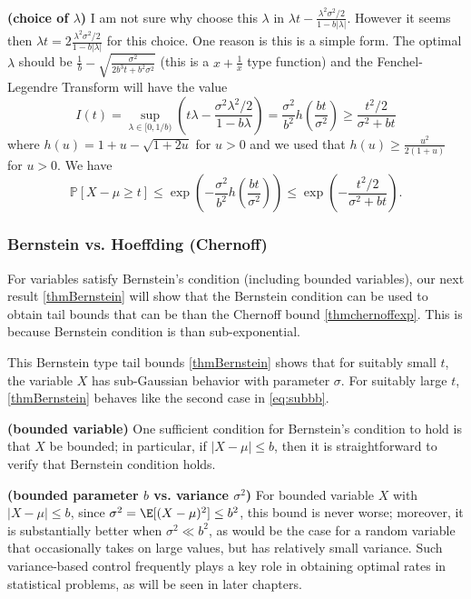 \documentclass{article}
\newcommand{\bfs}[1]{\textbf{({#1})}}
\begin{document}
\begin{rema}{\bfs{choice of $\lambda$}}\label{choicelambda}
 I am not sure why choose this $\lambda$ in $\lambda t - \frac{\lambda^{2} \sigma^{2} / 2}{1-b|\lambda|}$. However it seems then $\lambda t = 2\frac{\lambda^{2} \sigma^{2} / 2}{1-b|\lambda|}$ for this choice. One reason is this is a simple form. The optimal $\lambda$ should be $\frac{1}{b}-\sqrt{\frac{\sigma^2}{2b^3t+b^2\sigma^2}}$ (this is a $x+\frac{1}{x}$ type function) and the Fenchel-Legendre Transform will have the value 
 $$
I(t)=\sup _{\lambda \in[0,1 / b)}\left(t \lambda-\frac{\sigma^2 \lambda^{2} / 2}{1-b \lambda}\right)=\frac{\sigma^2}{b^{2}} h\left(\frac{b t}{\sigma^2}\right) \geq \frac{t^{2} / 2}{\sigma^2+b t}
$$
where $h(u)=1+u-\sqrt{1+2 u}$ for $u>0$ and we used that $h(u) \geq \frac{u^{2}}{2(1+u)}$ for $u>0$. We have
$$
\mathbb{P}[X-\mu \geq t] \leq \exp \left(-\frac{\sigma^2}{b^{2}} h\left(\frac{b t}{\sigma^2}\right)\right) \leq \exp \left(-\frac{t^{2} / 2}{\sigma^2+b t}\right) .
$$
\end{rema}

\subsubsection{Bernstein vs. Hoeffding (Chernoff)}

 For variables satisfy Bernstein's condition (including bounded variables), our next result \cref{thmBernstein} will show that the Bernstein condition can be used to obtain tail bounds that can be  than the Chernoff bound \cref{thmchernoffexp}. This is because Bernstein condition is  than sub-exponential.
 
 This Bernstein type tail bounds \cref{thmBernstein} shows that for suitably small $t$, the variable $X$ has sub-Gaussian behavior with parameter $\sigma$. For suitably large $t$, \cref{thmBernstein} behaves like the second case in \cref{eq:subbb}.
 
  \begin{exma}{\bfs{bounded variable}}
       One sufficient condition for Bernstein's condition to hold is that $X$ be bounded; in particular, if $|X-\mu| \leq b$, then it is straightforward to verify that Bernstein condition holds. 
  \end{exma}
  
\begin{rema}{\bfs{bounded parameter $b$ vs. variance $\sigma^2$}}
 For bounded variable $X$ with $|X-\mu| \leq b$, since $\sigma^2 = \E[(X-\mu)^2] \le b^2$, this bound is never worse; moreover, it is substantially better when $\sigma^2 \ll b^2$, as would be the case for a random variable that occasionally takes on large values, but has relatively small variance. Such variance-based control frequently plays a key role in obtaining optimal rates in statistical problems, as will be seen in later chapters. 
\end{rema}  
 
\end{document}
